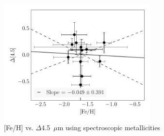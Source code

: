 \documentclass[a4paper,fleqn,usenatbib]{mnras}
\begin{document}
\begin{figure}
\begin{center}
\includegraphics[width=80mm]{final_plots/delta_feh_4p5_spect.pdf}
\caption{[Fe/H] vs. $\Delta$4.5~$\mu$m using spectroscopic metallicities}
\label{fig:delta_4p5_spect}
\end{center}
\end{figure}




\bsp	%
\label{lastpage}
\end{document}

